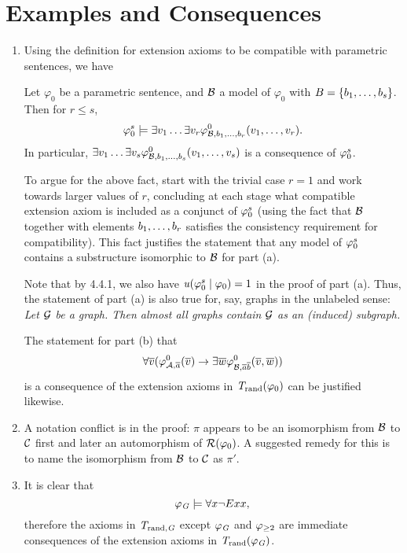 \setcounter{section}{3}
\section{Examples and Consequences}
\begin{enumerate}[1.]
%
\item {} Using the definition for extension axioms to be compatible with parametric sentences, we have
\begin{fact}
Let $\varphi_0$ be a parametric sentence, and $\mathcal{B}$ a model of $\varphi_0$ with $B = {\{b_1, \ldots, b_s\}}$. Then for $r \leq s$,
\[
\conjextaxm[\varphi_0]{s} \consq \exists v_1 \etc \exists v_r \hint{0}{\strct{B}, b_1, \etc, b_r}(v_1, \etc, v_r).
\]
In particular, $\exists v_1 \ldots \exists v_s \varphi^{0}_{\mathcal{B}, b_1, \ldots, b_s}(v_1, \ldots, v_s)$ is a consequence of $\conjextaxm[\varphi_0]{s}$.
\end{fact}
To argue for the above fact, start with the trivial case $r = 1$ and work towards larger values of $r$, concluding at each stage what compatible extension axiom is included as a conjunct of $\conjextaxm[\varphi_0]{s}$ (using the fact that $\mathcal{B}$ together with elements $b_1, \ldots, b_r$ satisfies the consistency requirement for compatibility). This fact justifies the statement that any model of $\conjextaxm[\varphi_0]{s}$ contains a substructure isomorphic to $\mathcal{B}$ for part (a).

\begin{remark}
Note that by 4.4.1, we also have $\uprob(\conjextaxm[\varphi_0]{s} \wrt \varphi_0) = 1$ in the proof of part (a). Thus, the statement of part (a) is also true for, say, graphs in the unlabeled sense: \emph{Let $\mathcal{G}$ be a graph. Then almost all graphs contain $\mathcal{G}$ as an (induced) subgraph.}
\end{remark}

The statement for part (b) that
\[
\forall \overline{v}(\varphi^{0}_{\mathcal{A}, \overline{a}}(\overline{v}) \rightarrow \exists \overline{w} \varphi^{0}_{\mathcal{B}, \overline{a}\overline{b}}(\overline{v}, \overline{w}))
\]
is a consequence of the extension axioms in $\mathit{T}_{\mathrm{rand}}(\varphi_0)$ can be justified likewise.
%
\item {} A notation conflict is in the proof: $\pi$ appears to be an isomorphism from $\mathcal{B}$ to $\mathcal{C}$ first and later an automorphism of $\mathcal{R}(\varphi_0)$. A suggested remedy for this is to name the isomorphism from $\mathcal{B}$ to $\mathcal{C}$ as $\pi'$.
%
\item {} It is clear that
\[
\varphi_{\mathit{G}} \models \forall x \neg Exx,
\]
therefore the axioms in $\mathit{T}_{\mathrm{rand}, \mathit{G}}$ except $\varphi_{\mathit{G}}$ and $\varphi_{\geq 2}$ are immediate consequences of the extension axioms in $\mathit{T}_{\mathrm{rand}}(\varphi_{\mathit{G}})$.


\end{enumerate}
